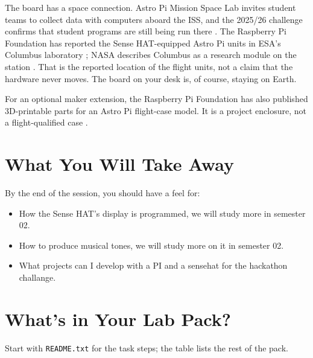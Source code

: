 \documentclass[12pt]{article}
\begin{document}
\begin{tcolorbox}[colback=UoGLight,colframe=UoGMaroon,title=The Sense HAT in space]
The board has a space connection. Astro Pi Mission Space Lab invites student teams to collect data with computers aboard the ISS, and the 2025/26 challenge confirms that student programs are still being run there \cite{astro-mission,astropi-current}. The Raspberry Pi Foundation has reported the Sense HAT-equipped Astro Pi units in ESA's Columbus laboratory \cite{astropi-location}; NASA describes Columbus as a research module on the station \cite{nasa-columbus}. That is the reported location of the flight units, not a claim that the hardware never moves. The board on your desk is, of course, staying on Earth.
\end{tcolorbox}

For an optional maker extension, the Raspberry Pi Foundation has also published 3D-printable parts for an Astro Pi flight-case model. It is a project enclosure, not a flight-qualified case \cite{astro-flight-case}.

\section*{What You Will Take Away}
By the end of the session, you should have a feel for:
\begin{itemize}
  \item How the Sense HAT's display is programmed, we will study more in semester 02.
  \item How to produce musical tones, we will study more on it in semester 02.
  \item What projects can I develop with a PI and a sensehat for the hackathon challange.
\end{itemize}

\Needspace{0.6\textheight}
\section*{What's in Your Lab Pack?}
Start with \texttt{README.txt} for the task steps; the table lists the rest of the pack.
\end{document}
